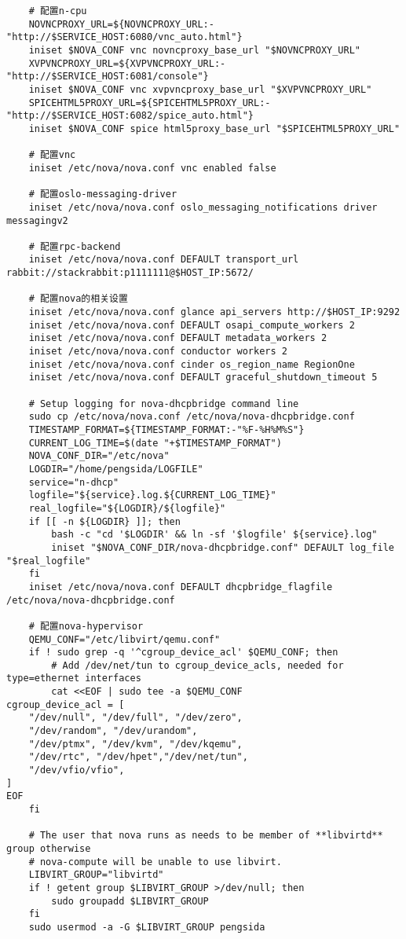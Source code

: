 \documentclass[a4paper,left=1.5cm,right=1.5cm,11pt]{article}
\begin{document}
\begin{lstlisting}
	# 配置n-cpu
	NOVNCPROXY_URL=${NOVNCPROXY_URL:-"http://$SERVICE_HOST:6080/vnc_auto.html"}
	iniset $NOVA_CONF vnc novncproxy_base_url "$NOVNCPROXY_URL"
	XVPVNCPROXY_URL=${XVPVNCPROXY_URL:-"http://$SERVICE_HOST:6081/console"}
	iniset $NOVA_CONF vnc xvpvncproxy_base_url "$XVPVNCPROXY_URL"
	SPICEHTML5PROXY_URL=${SPICEHTML5PROXY_URL:-"http://$SERVICE_HOST:6082/spice_auto.html"}
	iniset $NOVA_CONF spice html5proxy_base_url "$SPICEHTML5PROXY_URL"

	# 配置vnc
	iniset /etc/nova/nova.conf vnc enabled false

	# 配置oslo-messaging-driver
	iniset /etc/nova/nova.conf oslo_messaging_notifications driver messagingv2

	# 配置rpc-backend
	iniset /etc/nova/nova.conf DEFAULT transport_url rabbit://stackrabbit:p1111111@$HOST_IP:5672/

	# 配置nova的相关设置
	iniset /etc/nova/nova.conf glance api_servers http://$HOST_IP:9292
    iniset /etc/nova/nova.conf DEFAULT osapi_compute_workers 2
    iniset /etc/nova/nova.conf DEFAULT metadata_workers 2
    iniset /etc/nova/nova.conf conductor workers 2
    iniset /etc/nova/nova.conf cinder os_region_name RegionOne
	iniset /etc/nova/nova.conf DEFAULT graceful_shutdown_timeout 5
	 
	# Setup logging for nova-dhcpbridge command line
    sudo cp /etc/nova/nova.conf /etc/nova/nova-dhcpbridge.conf
	TIMESTAMP_FORMAT=${TIMESTAMP_FORMAT:-"%F-%H%M%S"}
	CURRENT_LOG_TIME=$(date "+$TIMESTAMP_FORMAT")
	NOVA_CONF_DIR="/etc/nova"
	LOGDIR="/home/pengsida/LOGFILE"
	service="n-dhcp"
    logfile="${service}.log.${CURRENT_LOG_TIME}"
    real_logfile="${LOGDIR}/${logfile}"
	if [[ -n ${LOGDIR} ]]; then
        bash -c "cd '$LOGDIR' && ln -sf '$logfile' ${service}.log"
        iniset "$NOVA_CONF_DIR/nova-dhcpbridge.conf" DEFAULT log_file "$real_logfile"
    fi
	iniset /etc/nova/nova.conf DEFAULT dhcpbridge_flagfile /etc/nova/nova-dhcpbridge.conf

	# 配置nova-hypervisor
	QEMU_CONF="/etc/libvirt/qemu.conf"
	if ! sudo grep -q '^cgroup_device_acl' $QEMU_CONF; then
        # Add /dev/net/tun to cgroup_device_acls, needed for type=ethernet interfaces
        cat <<EOF | sudo tee -a $QEMU_CONF
cgroup_device_acl = [
    "/dev/null", "/dev/full", "/dev/zero",
    "/dev/random", "/dev/urandom",
    "/dev/ptmx", "/dev/kvm", "/dev/kqemu",
    "/dev/rtc", "/dev/hpet","/dev/net/tun",
    "/dev/vfio/vfio",
]
EOF
    fi
	
	# The user that nova runs as needs to be member of **libvirtd** group otherwise
    # nova-compute will be unable to use libvirt.
	LIBVIRT_GROUP="libvirtd"
    if ! getent group $LIBVIRT_GROUP >/dev/null; then
        sudo groupadd $LIBVIRT_GROUP
    fi
	sudo usermod -a -G $LIBVIRT_GROUP pengsida


\end{lstlisting}
\end{document}
